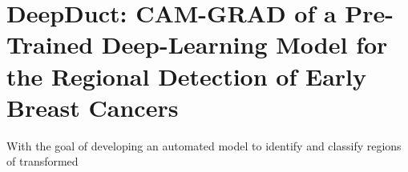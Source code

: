 \section{DeepDuct: CAM-GRAD of a Pre-Trained Deep-Learning Model for the Regional Detection of Early Breast Cancers}

With the goal of developing an automated model to identify and classify regions of transformed 